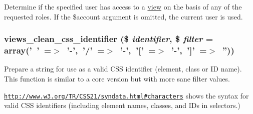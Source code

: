 Determine if the specified user has access to a \hyperlink{classview}{view} on the basis of any of the requested roles. If the \$account argument is omitted, the current user is used. \hypertarget{views_8module_ab664f954156e8a19e30b4db39812fad6}{
\subsubsection[{views\_\-clean\_\-css\_\-identifier}]{\setlength{\rightskip}{0pt plus 5cm}views\_\-clean\_\-css\_\-identifier (\$ {\em identifier}, \/  \$ {\em filter} = {\ttfamily array('~'~=$>$~'-\/',~'/'~=$>$~'-\/',~'\mbox{[}'~=$>$~'-\/',~'\mbox{]}'~=$>$~'')})}}
\label{views_8module_ab664f954156e8a19e30b4db39812fad6}
Prepare a string for use as a valid CSS identifier (element, class or ID name). This function is similar to a core version but with more sane filter values.

\href{http://www.w3.org/TR/CSS21/syndata.html#characters}{\tt http://www.w3.org/TR/CSS21/syndata.html\#characters} shows the syntax for valid CSS identifiers (including element names, classes, and IDs in selectors.)


